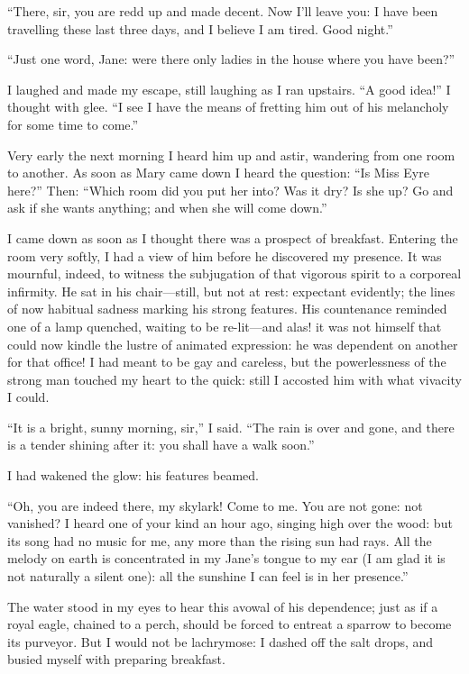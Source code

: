 \enquote{There, sir, you are redd up and made decent. Now I'll leave
	you: I have been travelling these last three days, and I believe I am
	tired. Good night.}

\enquote{Just one word, Jane: were there only ladies in the house where
	you have been?}

I laughed and made my escape, still laughing as I ran upstairs.
\enquote{A good idea!} I thought with glee. \enquote{I see I have the
	means of fretting him out of his melancholy for some time to come.}

Very early the next morning I heard him up and astir, wandering from one
room to another. As soon as Mary came down I heard the question:
\enquote{Is Miss Eyre here?} Then: \enquote{Which room did you put her
	into? Was it dry? Is she up? Go and ask if she wants anything; and
	when she will come down.}

I came down as soon as I thought there was a prospect of breakfast.
Entering the room very softly, I had a view of him before he discovered
my presence. It was mournful, indeed, to witness the subjugation of
that vigorous spirit to a corporeal infirmity. He sat in his
chair---still, but not at rest: expectant evidently; the lines of now
habitual sadness marking his strong features. His countenance reminded
one of a lamp quenched, waiting to be re-lit---and alas! it was not
himself that could now kindle the lustre of animated expression: he was
dependent on another for that office! I had meant to be gay and
careless, but the powerlessness of the strong man touched my heart to
the quick: still I accosted him with what vivacity I could.

\enquote{It is a bright, sunny morning, sir,} I said. \enquote{The rain
	is over and gone, and there is a tender shining after it: you shall have
	a walk soon.}

I had wakened the glow: his features beamed.

\enquote{Oh, you are indeed there, my skylark! Come to me. You are not
	gone: not vanished? I heard one of your kind an hour ago, singing high
	over the wood: but its song had no music for me, any more than the
	rising sun had rays. All the melody on earth is concentrated in my
	Jane's tongue to my ear (I am glad it is not naturally a silent one):
	all the sunshine I can feel is in her presence.}

The water stood in my eyes to hear this avowal of his dependence; just
as if a royal eagle, chained to a perch, should be forced to entreat a
sparrow to become its purveyor. But I would not be lachrymose: I dashed
off the salt drops, and busied myself with preparing breakfast.

